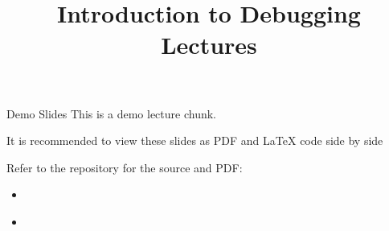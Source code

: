 \documentclass[11pt,compress,t,notes=noshow, xcolor=table]{beamer}
\title{Introduction to Debugging Lectures}
\begin{document}

\begin{frame}{Demo Slides}
  This is a demo lecture chunk.

  It is recommended to view these slides as PDF and LaTeX code side by side

  Refer to the  repository for the source and PDF:
  \begin{itemize}
    \item \href{https://slds-lmu.github.io/lecture_debug/lecture_debug/slides/demo/slides-demo-layout.pdf}{}
    \item \href{https://github.com/slds-lmu/lecture_debug/blob/main/slides/demo/slides-demo-layout.tex}{}
  \end{itemize}

\end{frame}
\end{document}
